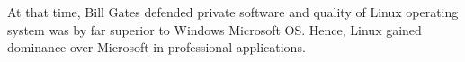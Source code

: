  At that time,  Bill Gates defended private software and quality of Linux operating system 
 was by far superior to Windows Microsoft OS. Hence, Linux gained dominance over Microsoft in professional 
 applications.  
 
 
 
 
 
 
 
 
 
 
 
